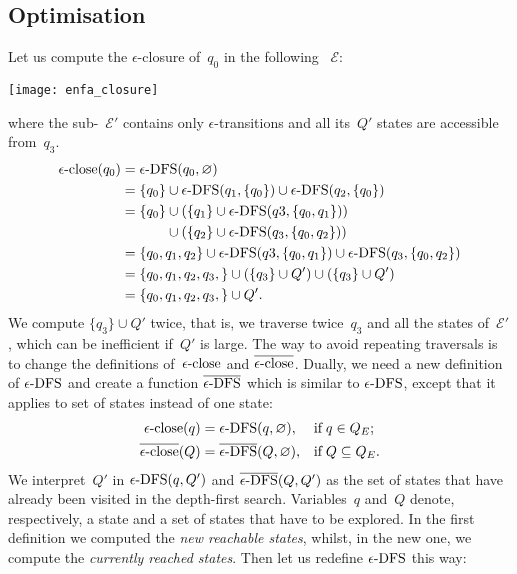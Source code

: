\subsection*{Optimisation}
\label{enfa_closure}

Let us compute the \(\epsilon\)-closure of~\(q_0\) in the following
\eNFA~\(\mathcal{E}\):
\begin{center}
\texttt{[image: enfa\_closure]}
\end{center}
where the sub-\eNFA~\(\mathcal{E'}\) contains only
\(\epsilon\)-transitions and all its~\(Q'\) states are accessible
from~\(q_3\).
\begin{align*}
   \eClose (q_0) 
&= \eDFS (q_0, \varnothing)\\
&= \{q_0\} \cup \eDFS (q_1, \{q_0\}) \cup \eDFS (q_2, \{q_0\})\\
&= \{q_0\} \cup (\{q_1\} \cup \eDFS (q3, \{q_0, q_1\}))\\
&\mathrel{\phantom{=}} \phantom{\{q_0\}}{} \cup (\{q_2\} \cup \eDFS
   (q_3, \{q_0, q_2\}))\\
&= \{q_0, q_1, q_2\} \cup \eDFS (q3, \{q_0, q_1\}) \cup \eDFS
   (q_3, \{q_0, q_2\})\\
&= \{q_0, q_1, q_2, q_3,\} \cup (\{q_3\} \cup Q') \cup (\{q_3\} \cup Q')\\
&= \{q_0, q_1, q_2, q_3,\} \cup Q'.
\end{align*}
We compute \(\{q_3\} \cup Q'\) twice, that is, we traverse
twice~\(q_3\) and all the states of~\(\mathcal{E'}\), which can be
inefficient if~\(Q'\) is large. The way to avoid repeating traversals
is to change the definitions of~\(\epsilon\text{-close}\) and
\(\overline{\epsilon\text{-close}}\). Dually, we need a new definition of \(\epsilon\text{-DFS}\) and
create a function \(\overline{\epsilon\text{-DFS}}\) which is similar to \(\epsilon\text{-DFS}\), except
that it applies to set of states instead of one state:
\begin{align*}
   \epsilon\text{-close} (q) 
&= \epsilon\text{-DFS} (q, \varnothing),
&& \text{if} \; q \in Q_E;\\
   \overline{\epsilon\text{-close}} (Q)
&= \overline{\epsilon\text{-DFS}} (Q, \varnothing),
&& \text{if} \; Q \subseteq Q_E.
\end{align*}
We interpret~\(Q'\) in \(\epsilon\text{-DFS} (q, Q')\) and \(\overline{\epsilon\text{-DFS}} (Q, Q')\) as
the set of states that have already been visited in the depth-first
search. Variables~\(q\) and~\(Q\) denote, respectively, a state and a
set of states that have to be explored. In the first definition we
computed the \emph{new reachable states}, whilst, in the new one, we
compute the \emph{currently reached states}. Then let us redefine
\(\epsilon\text{-DFS}\) this way:
